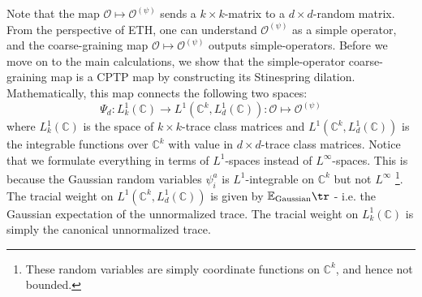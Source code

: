 \documentclass[a4paper,11pt]{article}
\theoremstyle{definition}
\numberwithin{equation}{section}
\begin{document}
Note that the map $\mathcal{O}\mapsto \mathcal{O}^{(\psi)}$ sends a $k\times k$-matrix to a $d\times d$-random matrix. From the perspective of ETH, one can understand $\mathcal{O}^{(\psi)}$ as a simple operator, and the coarse-graining map $\mathcal{O}\mapsto \mathcal{O}^{(\psi)}$ outputs simple-operators.
Before we move on to the main calculations, we show that the simple-operator coarse-graining map is a CPTP map by constructing its Stinespring dilation. Mathematically, this map connects the following two spaces:
\begin{equation}
    \Psi_d: L_k^1(\mathbb{C})\rightarrow L^1(\mathbb{C}^k, L_d^1(\mathbb{C})): \mathcal{O}\mapsto \mathcal{O}^{(\psi)}
\end{equation}
where $L_k^1(\mathbb{C})$ is the space of $k\times k$-trace class matrices and $L^1(\mathbb{C}^k, L_d^1(\mathbb{C}))$ is the integrable functions over $\mathbb{C}^k$ with value in $d\times d$-trace class matrices. Notice that we formulate everything in terms of $L^1$-spaces instead of $L^\infty$-spaces. This is because the Gaussian random variables $\psi^a_i$ is $L^1$-integrable on $\mathbb{C}^k$ but not $L^\infty$ \footnote{These random variables are simply coordinate functions on $\mathbb{C}^k$, and hence not bounded.}. The tracial weight on $L^1(\mathbb{C}^k, L_d^1(\mathbb{C}))$ is given by $\mathbb{E}_\text{Gaussian}\tr$ - i.e. the Gaussian expectation of the unnormalized trace. The tracial weight on $L^1_k(\mathbb{C})$ is simply the canonical unnormalized trace.
\end{document}
